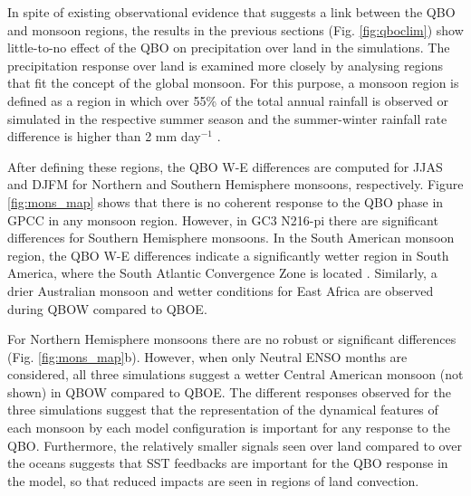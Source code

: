 In spite of existing observational evidence \citep{collimore2003,liess2012,gray2018} that suggests a link between the QBO and monsoon regions, the results in the previous sections (Fig. \ref{fig:qboclim}) show little-to-no effect of the QBO on precipitation over land in the simulations. 
The precipitation response over land is examined more closely by analysing regions that fit the concept of the global monsoon. For this purpose, a monsoon region is defined as a region in which over 55\% of the total annual rainfall is observed or simulated in the respective summer season and the summer-winter rainfall rate difference is higher than  2 mm day$^{-1}$ \citep{wang2008,wang2017,wang2021monsoons}. 

After defining these regions, the QBO W-E differences are computed for JJAS and DJFM for Northern and Southern Hemisphere monsoons, respectively. 
Figure \ref{fig:mons_map} shows that there is no coherent response to the QBO phase in  GPCC in any monsoon region. However, in GC3 N216-pi there are significant differences for Southern Hemisphere monsoons. In the South American monsoon region, the QBO W-E differences indicate a significantly wetter region in South America, where the South Atlantic Convergence Zone is located \citep{carvalho2004,jorgetti2014}. Similarly, a drier Australian monsoon and wetter conditions for East Africa are observed during QBOW compared to QBOE.

For Northern Hemisphere monsoons there are no robust or significant differences (Fig. \ref{fig:mons_map}b). However, when only Neutral ENSO months are considered, all three simulations suggest a wetter Central American monsoon (not shown) in QBOW compared to QBOE. 
The different responses observed for the three simulations suggest that the representation of the dynamical features of each monsoon by each model configuration is important for any response to the QBO. Furthermore, the relatively smaller signals seen over land compared to over the oceans suggests that SST feedbacks are important for the QBO response in the model, so that reduced impacts are seen in regions of land convection. 

